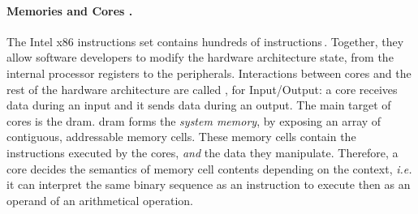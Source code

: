 %

\paragraph{Memories and Cores \IOs.}
%
The Intel x86 instructions set contains hundreds of instructions\,\cite[Volume
2]{intel2014manual}.
%
Together, they allow software developers to modify the hardware architecture
state, from the internal processor registers to the peripherals.
%
Interactions between cores and the rest of the hardware architecture are called
\IOs, for Input/Output: a core receives data during an input and it sends data
during an output.
%
The main target of cores \IOs is the \ac{dram}.
%
\ac{dram} forms the \emph{system memory}, by exposing an array of contiguous,
addressable memory cells.
%
These memory cells contain the instructions executed by the cores, \emph{and}
the data they manipulate.
%
Therefore, a core decides the semantics of memory cell contents
depending on the context, \emph{i.e.} it can interpret the same binary sequence as an
instruction to execute then as an operand of an arithmetical operation.

